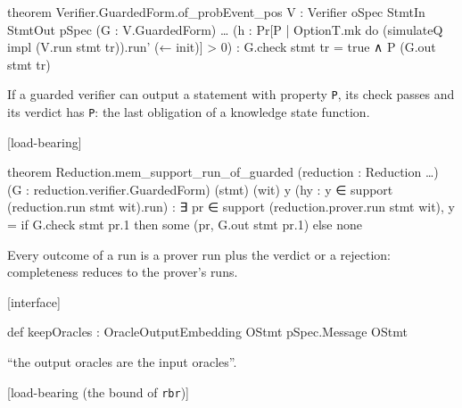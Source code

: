 \begin{leancode}
theorem Verifier.GuardedForm.of_probEvent_pos {V : Verifier oSpec StmtIn StmtOut pSpec} (G : V.GuardedForm) … (h : Pr[P | OptionT.mk do (simulateQ impl (V.run stmt tr)).run' (← init)] > 0) : G.check stmt tr = true ∧ P (G.out stmt tr)
\end{leancode}


If a guarded verifier can output a statement with property \texttt{P}, its check passes and its verdict has \texttt{P}: the last obligation of a knowledge state function.

\par\medskip\noindent\textbf{}\hfill\textsf{\small [load-bearing]}\par\nopagebreak

\begin{leancode}
theorem Reduction.mem_support_run_of_guarded (reduction : Reduction …) (G : reduction.verifier.GuardedForm) (stmt) (wit) {y} (hy : y ∈ support (reduction.run stmt wit).run) : ∃ pr ∈ support (reduction.prover.run stmt wit), y = if G.check stmt pr.1 then some (pr, G.out stmt pr.1) else none
\end{leancode}


Every outcome of a run is a prover run plus the verdict or a rejection: completeness reduces to the prover's runs.

\par\medskip\noindent\textbf{}\hfill\textsf{\small [interface]}\par\nopagebreak

\begin{leancode}
def keepOracles : OracleOutputEmbedding OStmt pSpec.Message OStmt
\end{leancode}


\enquote{the output oracles are the input oracles}.

\par\medskip\noindent\textbf{}\hfill\textsf{\small [load-bearing (the bound of \texttt{rbr})]}\par\nopagebreak


